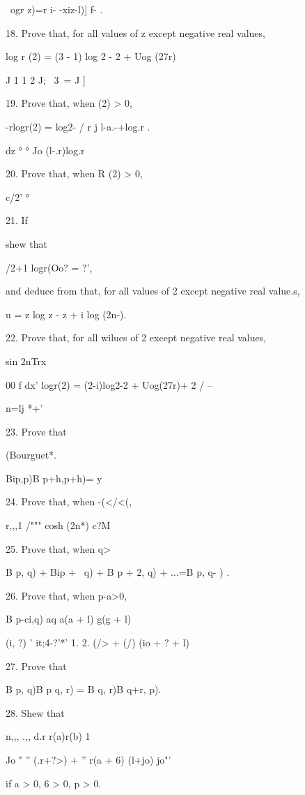 \ ogr z)=r i- -xiz-l)] f- . 

18. Prove that, for all values of z except negative real values,

log r (2) = (3 - 1) log 2 - 2 + Uog (27r)

J 1 1 2 J; \ 3\ = J ]

19. Prove that, when (2) > 0,

-rlogr(2) = log2- / r j l-a.-+log.r .

dz ° ° Jo (l-.r)log.r

20. Prove that, when R (2) > 0,

c/2' °

21. If

shew that

/2+1 logr(Oo? = ?',

and deduce from that, for all values of 2 except negative real
value.s,

u = z log z - z + i log (2n-).


22. Prove that, for all wilues of 2 except negative real values,

sin 2nTrx

00 f dx' logr(2) = (2-i)log2-2 + Uog(27r)+ 2 / --

n=lj *+'

23. Prove that

(Bourguet*.

Bip,p)B p+h,p+h)= y 

24. Prove that, when -(</<(,

r,,,1 /""" cosh (2n*) c?M

25. Prove that, when q>\,

B p, q) + Bip + \, q) + B p + 2, q) + ...=B p, q- ) .

26. Prove that, when p-a>0,

B p-ci,q) aq a(a + l) g(g + l)

 (i, ?) ' it;4-?'*' 1. 2. (/> + (/) (io + ? + l)

27. Prove that

B p, q)B p q, r) = B q, r)B q+r, p). 

28. Shew that

n,,, .,, d.r r(a)r(b) 1

Jo " '' (.r+?>) + '' r(a + 6) (l+jo) jo"'

if a > 0, 6 > 0, p > 0. 

